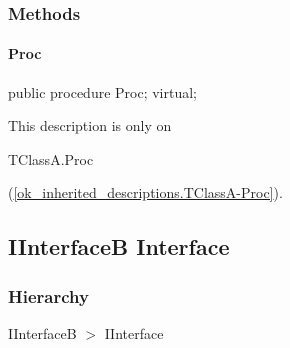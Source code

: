 \documentclass{report}
\newif\ifpdf
\begin{document}
\subsubsection*{\large{\textbf{Methods}}\normalsize\hspace{1ex}\hfill}
\paragraph*{Proc}\hspace*{\fill}

\label{ok_inherited_descriptions.TClassA-Proc}
\begin{list}{}{
\setlength{\itemindent}{0cm}
\setlength{\listparindent}{0cm}
\setlength{\leftmargin}{\evensidemargin}
\addtolength{\leftmargin}{\tmplength}
\settowidth{\labelsep}{X}
\addtolength{\leftmargin}{\labelsep}
\setlength{\labelwidth}{\tmplength}
}
\item[\textbf{Declaration}\hfill]
\ifpdf
\begin{flushleft}
\fi
\begin{ttfamily}
public procedure Proc; virtual;\end{ttfamily}

\ifpdf
\end{flushleft}
\fi

\par
\item[\textbf{Description}]
This description is only on \begin{ttfamily}TClassA.Proc\end{ttfamily}(\ref{ok_inherited_descriptions.TClassA-Proc}).

\end{list}
\ifpdf
\subsection*{\large{\textbf{IInterfaceB Interface}}\normalsize\hspace{1ex}\hrulefill}
\else
\subsection*{IInterfaceB Interface}
\fi
\label{ok_inherited_descriptions.IInterfaceB}
\subsubsection*{\large{\textbf{Hierarchy}}\normalsize\hspace{1ex}\hfill}
IInterfaceB {$>$} IInterface
\end{document}
